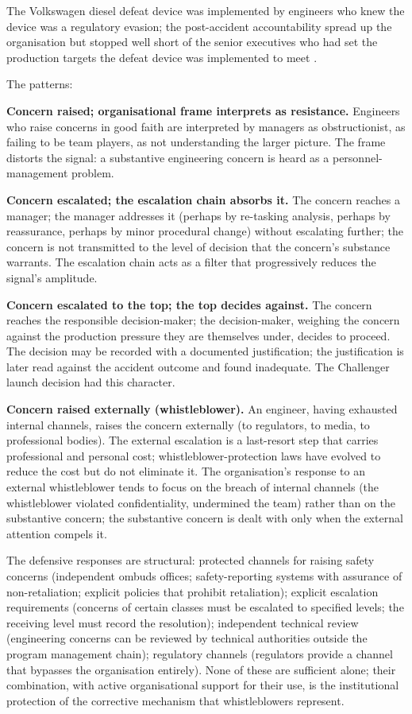 The Volkswagen diesel defeat device was implemented by engineers who knew the device was a regulatory evasion; the post-accident accountability spread up the organisation but stopped well short of the senior executives who had set the production targets the defeat device was implemented to meet \cite{acc:epa-vw-nov-2015}.

The patterns:

\textbf{Concern raised; organisational frame interprets as resistance.} Engineers who raise concerns in good faith are interpreted by managers as obstructionist, as failing to be team players, as not understanding the larger picture. The frame distorts the signal: a substantive engineering concern is heard as a personnel-management problem.

\textbf{Concern escalated; the escalation chain absorbs it.} The concern reaches a manager; the manager addresses it (perhaps by re-tasking analysis, perhaps by reassurance, perhaps by minor procedural change) without escalating further; the concern is not transmitted to the level of decision that the concern's substance warrants. The escalation chain acts as a filter that progressively reduces the signal's amplitude.

\textbf{Concern escalated to the top; the top decides against.} The concern reaches the responsible decision-maker; the decision-maker, weighing the concern against the production pressure they are themselves under, decides to proceed. The decision may be recorded with a documented justification; the justification is later read against the accident outcome and found inadequate. The Challenger launch decision had this character.

\textbf{Concern raised externally (whistleblower).} An engineer, having exhausted internal channels, raises the concern externally (to regulators, to media, to professional bodies). The external escalation is a last-resort step that carries professional and personal cost; whistleblower-protection laws have evolved to reduce the cost but do not eliminate it. The organisation's response to an external whistleblower tends to focus on the breach of internal channels (the whistleblower violated confidentiality, undermined the team) rather than on the substantive concern; the substantive concern is dealt with only when the external attention compels it.

The defensive responses are structural: protected channels for raising safety concerns (independent ombuds offices; safety-reporting systems with assurance of non-retaliation; explicit policies that prohibit retaliation); explicit escalation requirements (concerns of certain classes must be escalated to specified levels; the receiving level must record the resolution); independent technical review (engineering concerns can be reviewed by technical authorities outside the program management chain); regulatory channels (regulators provide a channel that bypasses the organisation entirely). None of these are sufficient alone; their combination, with active organisational support for their use, is the institutional protection of the corrective mechanism that whistleblowers represent.

